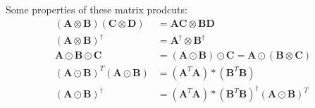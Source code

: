 \documentclass[preprint]{elsarticle}
\begin{document}
Some properties of these matrix prodcuts:
\begin{subequations}
    \begin{align}
        (\mathbf{A}\otimes\mathbf{B})(\mathbf{C}\otimes\mathbf{D}) &= \mathbf{A}\mathbf{C}\otimes\mathbf{B}\mathbf{D} \\
        (\mathbf{A}\otimes\mathbf{B})^{\dagger} &= \mathbf{A}^{\dagger}\otimes\mathbf{B}^{\dagger} \\
        \mathbf{A}\odot\mathbf{B}\odot\mathbf{C} &= (\mathbf{A}\odot\mathbf{B})\odot\mathbf{C} = \mathbf{A}\odot(\mathbf{B}\otimes\mathbf{C}) \\
        (\mathbf{A}\odot\mathbf{B})^T(\mathbf{A}\odot\mathbf{B}) &= (\mathbf{A}^T\mathbf{A})*(\mathbf{B}^T\mathbf{B}) \\
        (\mathbf{A}\odot\mathbf{B})^{\dagger} &= (\mathbf{A}^T\mathbf{A})*(\mathbf{B}^T\mathbf{B})^{\dagger}(\mathbf{A}\odot\mathbf{B})^T
    \end{align}
\end{subequations}
\end{document}
